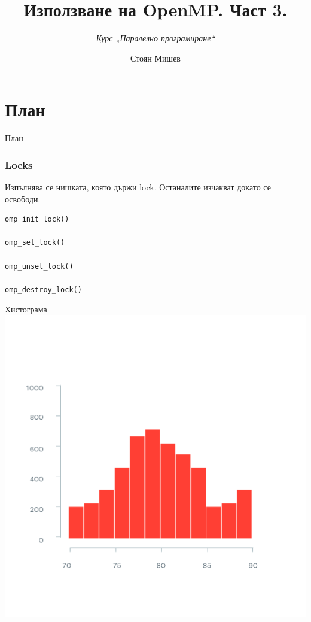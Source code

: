 \documentclass{beamer}
\title{Използване на OpenMP. Част 3.}
\subtitle{\textit{Курс „Паралелно програмиране“}}
\author{\newline \newline Стоян Мишев}
\date{} %
\begin{document}
\lstset{language=Python}
{ 
\frame{\titlepage}}


\section*{План}\begin{frame}{План}\tableofcontents\end{frame}


\begin{frame}[fragile]
  \frametitle{Locks}

  Изпълнява се нишката, която държи lock. Останалите изчакват докато се освободи. 

\begin{verbatim}
omp_init_lock()

omp_set_lock()

omp_unset_lock()

omp_destroy_lock()
\end{verbatim}
\end{frame}

\begin{frame}[plain]{Хистограма}
\includegraphics[width=\textwidth]{histogram}  
\end{frame}
\end{document}
